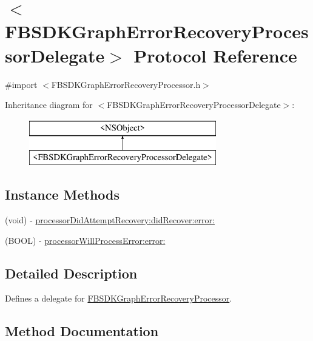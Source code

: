 \hypertarget{protocol_f_b_s_d_k_graph_error_recovery_processor_delegate-p}{}\section{$<$F\+B\+S\+D\+K\+Graph\+Error\+Recovery\+Processor\+Delegate$>$ Protocol Reference}
\label{protocol_f_b_s_d_k_graph_error_recovery_processor_delegate-p}


{\ttfamily \#import $<$F\+B\+S\+D\+K\+Graph\+Error\+Recovery\+Processor.\+h$>$}

Inheritance diagram for $<$F\+B\+S\+D\+K\+Graph\+Error\+Recovery\+Processor\+Delegate$>$\+:\begin{figure}[H]
\begin{center}
\leavevmode
\includegraphics[height=2.000000cm]{protocol_f_b_s_d_k_graph_error_recovery_processor_delegate-p}
\end{center}
\end{figure}
\subsection*{Instance Methods}
\begin{DoxyCompactItemize}
\item 
(void) -\/ \hyperlink{protocol_f_b_s_d_k_graph_error_recovery_processor_delegate-p_af555ae9c334da574281481928575bd28}{processor\+Did\+Attempt\+Recovery\+:did\+Recover\+:error\+:}
\item 
(B\+O\+O\+L) -\/ \hyperlink{protocol_f_b_s_d_k_graph_error_recovery_processor_delegate-p_a03db93d774a8a33632faf1e32d458da9}{processor\+Will\+Process\+Error\+:error\+:}
\end{DoxyCompactItemize}


\subsection{Detailed Description}
Defines a delegate for {\ttfamily \hyperlink{interface_f_b_s_d_k_graph_error_recovery_processor}{F\+B\+S\+D\+K\+Graph\+Error\+Recovery\+Processor}}. 

\subsection{Method Documentation}
\hypertarget{protocol_f_b_s_d_k_graph_error_recovery_processor_delegate-p_af555ae9c334da574281481928575bd28}{}
